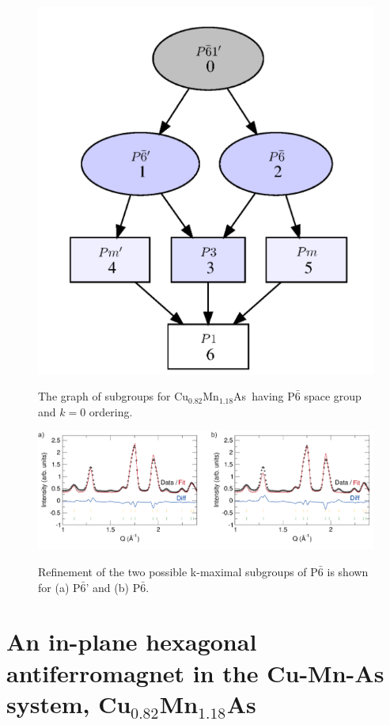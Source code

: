 \documentclass[10pt,doublespacing,edeposit]{uiucthesis2020}
\newcommand*{\cumnas}{Cu$_{0.82}$Mn$_{1.18}$As}
\begin{document}
\begin{mainmatter}
\begin{figure}
\centering\includegraphics[width=0.5\columnwidth]{figures/ch4/subgraph_cumnas.png} \\
\caption{\label{fig:subgraph_cumnas}
The graph of subgroups for \cumnas\ having P$\bar{6}$ space group and $k=0$ ordering.
}
\end{figure}


\begin{figure}
\centering\includegraphics[width=\columnwidth]{figures/ch4/wand_refinement.png} \\
\caption{\label{fig:wand_refinement}
Refinement of the two possible k-maximal subgroups of P$\bar{6}$ is shown for (a) P$\bar{6}$' and (b) P$\bar{6}$.
}
\end{figure}

\chapter{An in-plane hexagonal antiferromagnet in the Cu-Mn-As system, Cu$_{0.82}$Mn$_{1.18}$As}


\hfill \break


\end{mainmatter}
\end{document}
